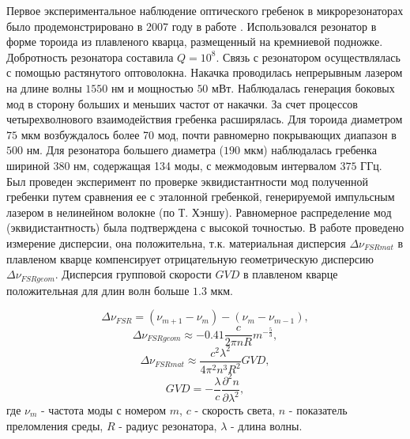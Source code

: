 Первое экспериментальное наблюдение оптического гребенок в микрорезонаторах было продемонстрировано в 2007 году в работе \cite{DelHaye2007}. Использовался резонатор в форме тороида из плавленого кварца, размещенный на кремниевой подножке. Добротность резонатора составила $Q=10^8$. Связь с резонатором осуществлялась с помощью растянутого оптоволокна. Накачка проводилась непрерывным лазером на длине волны $1550$ нм и мощностью $50$ мВт. Наблюдалась генерация боковых мод в сторону больших и меньших частот от накачки. За счет процессов четырехволнового взаимодействия гребенка расширялась. Для тороида диаметром $75$ мкм возбуждалось более 70 мод, почти равномерно покрывающих диапазон в $500$ нм. Для резонатора большего диаметра ($190$ мкм) наблюдалась гребенка шириной $380$ нм, содержащая 134 моды, с межмодовым интервалом $375$ ГГц. Был проведен эксперимент по проверке эквидистантности мод полученной гребенки путем сравнения ее с эталонной гребенкой, генерируемой импульсным лазером в нелинейном волокне (по Т. Хэншу). Равномерное распределение мод (эквидистантность) была подтверждена с высокой точностью. В работе проведено измерение дисперсии, она положительна, т.к. материальная дисперсия $\Delta\nu_{FSRmat}$ в плавленом кварце компенсирует отрицательную геометрическую дисперсию $\Delta\nu_{FSRgeom}$. Дисперсия групповой скорости $GVD$ в плавленом кварце положительная для длин волн больше $1.3$ мкм.

\begin{equation}
\Delta\nu_{FSR}=(\nu_{m+1}-\nu_m)-(\nu_m-\nu_{m-1}),
\end{equation}
\begin{equation}
\Delta\nu_{FSRgeom}\approx-0.41\frac{c}{2\pi nR}m^{-\frac{5}{3}},
\end{equation}
\begin{equation}
\Delta\nu_{FSRmat}\approx\frac{c^2\lambda^2}{4\pi^2n^3R^2}GVD,
\end{equation}
\begin{equation}
GVD=-\frac{\lambda}{c}\frac{\partial^2 n}{\partial \lambda^2},
\end{equation}
где $\nu_m$ - частота моды с номером $m$, $c$ - скорость света, $n$ - показатель преломления среды, $R$ - радиус резонатора, $\lambda$ - длина волны.

